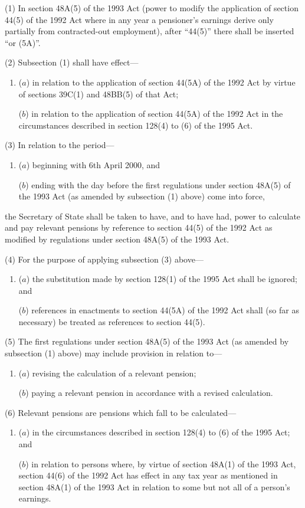 \documentclass[12pt,a4paper]{article}
\begin{document}
(1) In section 48A(5)  of the 1993 Act (power to modify the application of section 44(5)  of the 1992 Act where in any year a pensioner’s earnings derive only partially from contracted-out employment), after “44(5)” there shall be inserted “or (5A)”.

(2) Subsection (1)  shall have effect—
\begin{enumerate}\item[]
($a$) in relation to the application of section 44(5A)  of the 1992 Act by virtue of sections 39C(1)  and 48BB(5)  of that Act;

($b$) in relation to the application of section 44(5A)  of the 1992 Act in the circumstances described in section 128(4)  to (6)  of the 1995 Act.
\end{enumerate}

(3) In relation to the period—
\begin{enumerate}\item[]
($a$) beginning with 6th April 2000, and

($b$) ending with the day before the first regulations under section 48A(5)  of the 1993 Act (as amended by subsection (1)  above) come into force,
\end{enumerate}
the Secretary of State shall be taken to have, and to have had, power to calculate and pay relevant pensions by reference to section 44(5)  of the 1992 Act as modified by regulations under section 48A(5)  of the 1993 Act.

(4) For the purpose of applying subsection (3)  above—
\begin{enumerate}\item[]
($a$) the substitution made by section 128(1)  of the 1995 Act shall be ignored; and

($b$) references in enactments to section 44(5A)  of the 1992 Act shall (so far as necessary) be treated as references to section 44(5).
\end{enumerate}

(5) The first regulations under section 48A(5)  of the 1993 Act (as amended by subsection (1)  above) may include provision in relation to—
\begin{enumerate}\item[]
($a$) revising the calculation of a relevant pension;

($b$) paying a relevant pension in accordance with a revised calculation.
\end{enumerate}

(6) Relevant pensions are pensions which fall to be calculated—
\begin{enumerate}\item[]
($a$) in the circumstances described in section 128(4)  to (6)  of the 1995 Act; and

($b$) in relation to persons where, by virtue of section 48A(1)  of the 1993 Act, section 44(6)  of the 1992 Act has effect in any tax year as mentioned in section 48A(1)  of the 1993 Act in relation to some but not all of a person’s earnings.
\end{enumerate}
\end{document}

